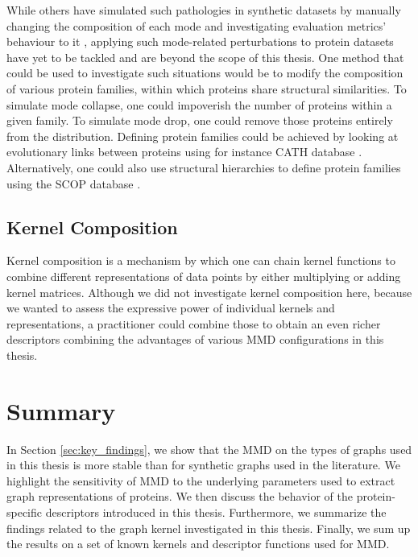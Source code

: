 While others have simulated such pathologies in synthetic datasets by manually
changing the composition of each mode and investigating evaluation metrics'
behaviour to it \citep{thompson2022evaluation}, applying such mode-related
perturbations to protein datasets have yet to be tackled and are beyond the scope
of this thesis. One method that could be used to investigate such situations
would be to modify the composition of various protein families, within which proteins
share structural similarities. To simulate mode collapse, one could impoverish the number of proteins
within a given family. To simulate mode drop, one could remove those proteins entirely from
the distribution. Defining protein families could be achieved by looking at
evolutionary links between proteins using for instance CATH database
\citep{orengo1997cath}. Alternatively, one could also use structural hierarchies
to define protein families using the SCOP database \citep{murzin1995scop}.

\subsection{Kernel Composition}

Kernel composition is a mechanism by which one can chain kernel functions to
combine different representations of data points by either multiplying or adding
kernel matrices. Although we did not investigate kernel composition here,
because we wanted to assess the expressive power of individual kernels and
representations, a practitioner could combine those to obtain an even richer
descriptors combining the advantages of various MMD configurations in this
thesis.

\section{Summary}


In Section \ref{sec:key_findings}, we show that the MMD on the types of graphs used in this
thesis is more stable than for synthetic graphs used in the literature. We
highlight the sensitivity of MMD to the underlying parameters used to extract
graph representations of proteins. We then discuss the behavior of the
protein-specific descriptors introduced in this thesis. Furthermore, we
summarize the findings related to the graph kernel investigated in this thesis.
Finally, we sum up the results on a set of known kernels and descriptor
functions used for MMD.

